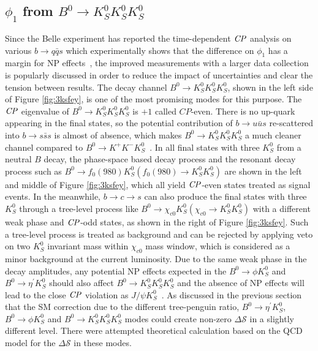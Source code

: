 \subsection{$\phi_1$ from $B^0 \to K_S^0  K_S^0  K_S^0$}%
Since the Belle experiment has reported the time-dependent $\it{CP}$ analysis on various $b\to q\bar{q}s$ which experimentally shows that the difference on $\phi_1$ has a margin for NP effects~\cite{chen2007observation}, the improved measurements with a larger data collection is popularly discussed in order to reduce the impact of uncertainties and clear the tension between results. The decay channel $B^0 \to K_S^0  K_S^0  K_S^0$, shown in the left side of Figure \ref{fig:3ksfey}, is one of the most promising modes for this purpose. The $\it{CP}$ eigenvalue of $B^0 \to K_S^0  K_S^0  K_S^0$ is $+1$ called $CP$-even. There is no up-quark appearing in the final states, so the potential contribution of $b\to u\bar{u}s$ re-scattered into $b\to s\bar{s}s$ is almost of absence, which makes $B^0 \to K_S^0  K_S^0  K_S^0$ a much cleaner channel compared to $B^0 \to K^+  K^-  K_S^0$~\cite{gershon2004time}. In all final states with three $K_S^0$ from a neutral $B$ decay, the phase-space based decay process and the resonant decay process such as $B^0\to f_0(980)K_S^0 (f_0(980)\to K_S^0 K_S^0)$ are shown in the left and middle of Figure \ref{fig:3ksfey}, which all yield $\it{CP}$-even states treated as signal events. In the meanwhile, $b\to c \to s$ can also produce the final states with three $K_S^0$ through a tree-level process like $B^0\to \chi_{c0}K_S^0(\chi_{c0}\to K_S^0 K_S^0)$ with a different weak phase and $\it{CP}$-odd states, as shown in the right of Figure \ref{fig:3ksfey}. Such a tree-level process is treated as background and can be rejected by applying veto on two $K_S^0$ invariant mass within $\chi_{c0}$ mass window, which is considered as a minor background at the current luminosity. Due to the same weak phase in the decay amplitudes, any potential NP effects expected in the $B^0 \to \phi K^0_S$ and $B^0 \to \eta^{'} K^0_S$ should also affect $B^0 \to K_S^0  K_S^0  K_S^0$ and the absence of NP effects will lead to the close $\it{CP}$ violation as $J/\psi K^0_S$~\cite{gershon2004time}.  As discussed in the previous section that the SM correction due to the different tree-penguin ratio, $B^0 \to \eta^{'} K^0_S$, $B^0 \to \phi K^0_S$ and  $B^0 \to K_S^0  K_S^0  K_S^0$ modes could create non-zero $\Delta \mathcal{S}$ in a slightly different level.
There were attempted theoretical calculation based on the QCD model for the $\Delta \mathcal{S}$ in these modes. 
